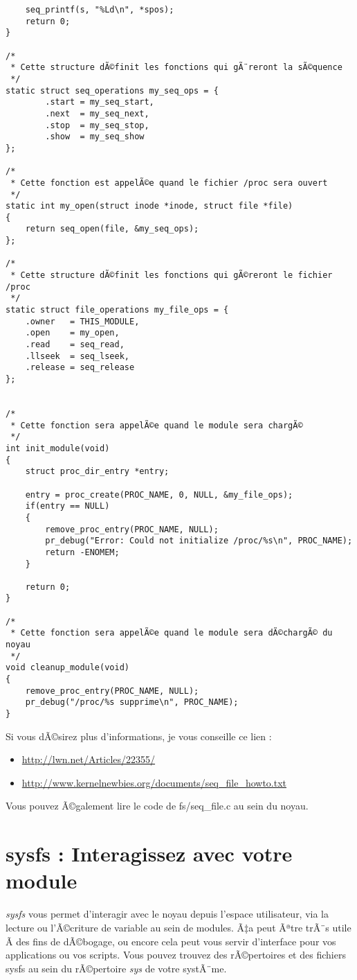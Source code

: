 \documentclass[11pt]{article}
\begin{document}
\begin{verbatim}
    seq_printf(s, "%Ld\n", *spos);
    return 0;
}

/*
 * Cette structure dÃ©finit les fonctions qui gÃ¨reront la sÃ©quence
 */
static struct seq_operations my_seq_ops = {
        .start = my_seq_start,
        .next  = my_seq_next,
        .stop  = my_seq_stop,
        .show  = my_seq_show
};

/*
 * Cette fonction est appelÃ©e quand le fichier /proc sera ouvert
 */
static int my_open(struct inode *inode, struct file *file)
{
    return seq_open(file, &my_seq_ops);
};

/*
 * Cette structure dÃ©finit les fonctions qui gÃ©reront le fichier /proc
 */
static struct file_operations my_file_ops = {
    .owner   = THIS_MODULE,
    .open    = my_open,
    .read    = seq_read,
    .llseek  = seq_lseek,
    .release = seq_release
};


/*
 * Cette fonction sera appelÃ©e quand le module sera chargÃ©
 */
int init_module(void)
{
    struct proc_dir_entry *entry;

    entry = proc_create(PROC_NAME, 0, NULL, &my_file_ops);
    if(entry == NULL)
    {
        remove_proc_entry(PROC_NAME, NULL);
        pr_debug("Error: Could not initialize /proc/%s\n", PROC_NAME);
        return -ENOMEM;
    }

    return 0;
}

/*
 * Cette fonction sera appelÃ©e quand le module sera dÃ©chargÃ© du noyau
 */
void cleanup_module(void)
{
    remove_proc_entry(PROC_NAME, NULL);
    pr_debug("/proc/%s supprime\n", PROC_NAME);
}
\end{verbatim}

Si vous dÃ©sirez plus d'informations, je vous conseille ce lien :

\begin{itemize}
\item \url{http://lwn.net/Articles/22355/}

\item \url{http://www.kernelnewbies.org/documents/seq_file_howto.txt}
\end{itemize}

Vous pouvez Ã©galement lire le code de fs/seq\_file.c au sein du noyau.

\section*{sysfs : Interagissez avec votre module}
\label{sec-8}

\emph{sysfs} vous permet d'interagir avec le noyau depuis l'espace utilisateur, via la lecture ou l'Ã©criture de variable au sein de modules. Ã‡a peut Ãªtre trÃ¨s utile Ã  des fins de dÃ©bogage, ou encore cela peut vous servir d'interface pour vos applications ou vos scripts. Vous pouvez trouvez des rÃ©pertoires et des fichiers sysfs au sein du rÃ©pertoire \emph{sys} de votre systÃ¨me.
\end{document}
